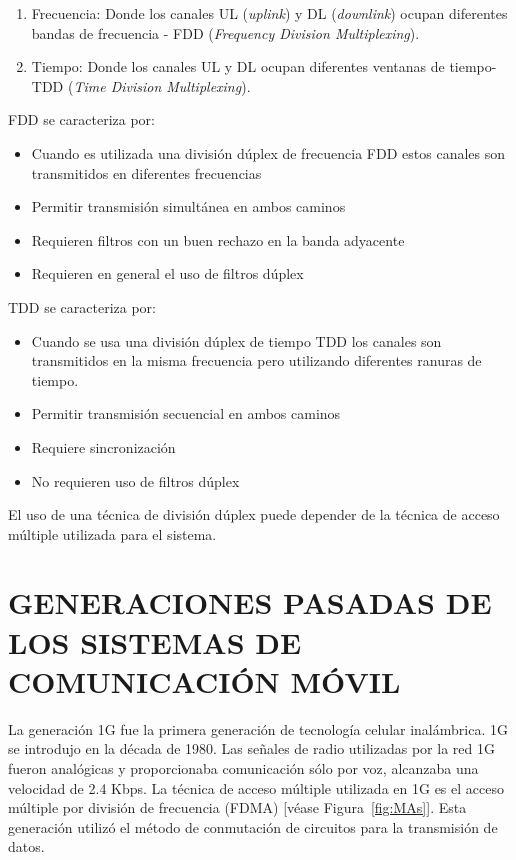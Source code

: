 \begin{enumerate}
\item  Frecuencia: Donde los canales UL (\textit{uplink}) y DL (\textit{downlink}) ocupan diferentes bandas de frecuencia - FDD (\textit{Frequency Division Multiplexing}).
\item  Tiempo: Donde los canales UL y DL ocupan diferentes ventanas de tiempo- TDD (\textit{Time Division Multiplexing}).
\end{enumerate}

FDD se caracteriza por: 
\begin{itemize}
\item  Cuando es utilizada una división dúplex de frecuencia FDD estos canales son transmitidos en diferentes frecuencias
\item  Permitir transmisión simultánea en ambos caminos
\item  Requieren filtros con un buen rechazo en la banda adyacente
\item  Requieren en general el uso de filtros dúplex
\end{itemize}

TDD se caracteriza por: 
\begin{itemize}
\item  Cuando se usa una división dúplex de tiempo TDD los canales son transmitidos en la misma frecuencia pero utilizando diferentes ranuras de tiempo.
\item  Permitir transmisión secuencial en ambos caminos
\item  Requiere sincronización
\item  No requieren uso de filtros dúplex
\end{itemize}

El uso de una técnica de división dúplex puede depender de la técnica de acceso múltiple utilizada para el sistema.


\section{GENERACIONES PASADAS DE LOS SISTEMAS DE COMUNICACIÓN MÓVIL}

La generación 1G fue la primera generación de tecnología celular inalámbrica. 1G se introdujo en la década de 1980. Las señales de radio utilizadas por la red 1G fueron analógicas y proporcionaba comunicación sólo por voz, alcanzaba una velocidad de 2.4 Kbps. La técnica de acceso múltiple utilizada en 1G es el acceso múltiple por división de frecuencia (FDMA) [véase Figura~\ref{fig:MAs}]\parencite{Nair2018}. Esta generación utilizó el método de conmutación de circuitos para la transmisión de datos. \newline

